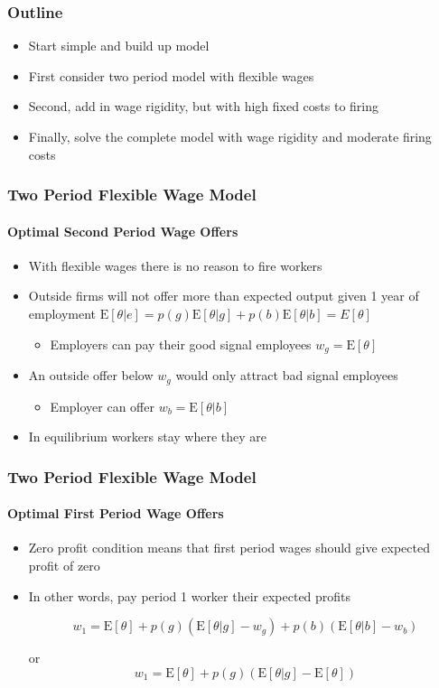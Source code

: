 \documentclass{beamer}
\newcommand{\E}{\mathrm{E}}
\begin{document}
\begin{frame}
\frametitle{Outline}
\begin{itemize}
	\setlength{\itemsep}{10mm}
	\item Start simple and build up model
	\item First consider two period model with flexible wages 
	\item Second, add in wage rigidity, but with high fixed costs to firing
	\item Finally, solve the complete model with wage rigidity and moderate firing costs 

\end{itemize}

\end{frame}



\begin{frame}
\frametitle{Two Period Flexible Wage Model}
\framesubtitle{Optimal Second Period Wage Offers}

\begin{itemize}
	\setlength{\itemsep}{3mm}
	\item With flexible wages there is no reason to fire workers
	\item Outside firms will not offer more than expected output given 1 year of employment $\E[ \theta | e] = p(g)\E[\theta | g] + p(b)\E[ \theta | b] = E[\theta]$
	\begin{itemize}
		\item Employers can pay their good signal employees $w_g = \E[\theta]$
	\end{itemize}
	\item An outside offer below $w_g$ would only attract bad signal employees 
	
	\begin{itemize}
		\item Employer can offer $ w_b = \E[\theta |b]$ 
	\end{itemize}

	\item In equilibrium workers stay where they are

\end{itemize}
\end{frame}


\begin{frame}
\frametitle{Two Period Flexible Wage Model}
\framesubtitle{Optimal First Period Wage Offers}

\begin{itemize}
	\setlength{\itemsep}{3mm}
	\item Zero profit condition means that first period wages should give expected profit of zero
	\item In other words, pay period 1 worker their expected profits
	
	$$w_1 = \E[\theta] + p(g)(\E[\theta|g] - w_g) + p(b)(\E[\theta | b] - w_b) 
	$$

	or 
	$$ w_1 = \E[\theta] + p(g)(\E[\theta | g] - \E[\theta]) $$
\end{itemize}

\end{frame}
\end{document}
